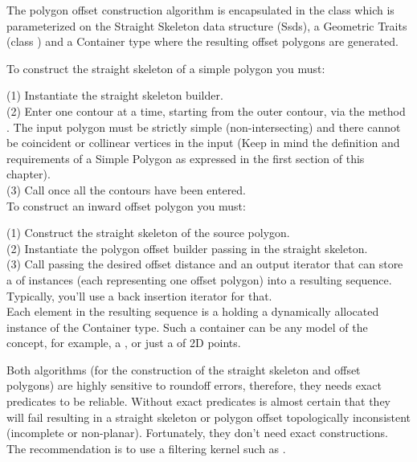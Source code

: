 The polygon offset construction algorithm is encapsulated in the class  which is parameterized on the Straight Skeleton data structure (Ssds), a Geometric Traits (class ) and a Container type where the resulting offset polygons are generated.

To construct the straight skeleton of a simple polygon you must:
 
(1) Instantiate the straight skeleton builder.\\
(2) Enter one contour at a time, starting from the outer contour, via the method . The input polygon must be strictly simple (non-intersecting) and there cannot be coincident or collinear vertices in the input (Keep in mind the definition and requirements of a Simple Polygon as expressed in the first section of this chapter).\\
(3) Call  once all the contours have been entered.\\

To construct an inward offset polygon you must:
 
(1) Construct the straight skeleton of the source polygon.\\
(2) Instantiate the polygon offset builder passing in the straight skeleton.\\
(3) Call  passing the desired offset distance and an output iterator that can store a  of  instances (each representing one offset polygon) into a resulting sequence. Typically, you'll use a back insertion iterator for that.\\
Each element in the resulting sequence is a  holding a dynamically allocated instance of the Container type. Such a container can be any model of the  concept, for example, a , or just a  of 2D points.

Both algorithms (for the construction of the straight skeleton and offset polygons) are highly sensitive to roundoff errors, therefore, they needs exact predicates to be reliable. Without exact predicates is almost certain that they will fail resulting in a straight skeleton or polygon offset topologically inconsistent (incomplete or non-planar). Fortunately, they don't need exact constructions.\\
The recommendation is to use a filtering kernel such as .

